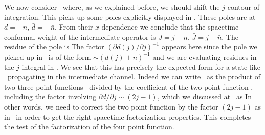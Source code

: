 


We now consider
\intadd\ where, as we  explained before, we should shift the $j$
contour of integration. This picks up some poles explicitly
displayed in \expandF .
These poles are at $d =-n$, $\bar d = -\bar n$. From their
$x$ dependence we conclude that the spacetime conformal weight
of the intermediate operator is $J = j-n$, $\bar J = j - \bar n$.
The residue of the pole is
\eqn{}
The factor $(\partial d(j) / \partial j)^{-1}$
 appears here since the pole we picked up
in \expandF\ is of the form $\sim (d(j)+ n)^{-1}$
and we are evaluating residues in the $j$ integral in \intadd .
We see that this
has precisely the expected form for a state like
\statef\ propagating in the intermediate channel.
Indeed we can write \polesinj\ as the product of two three point
functions \threepxus\ divided by the coefficient of the
two point function \twoneg , including
the factor involving $\partial d / \partial j \sim  (2 j-1) $,
which we discussed at \twoptcorr\ as
\eqn{}
In other words, we need to
correct the two point function by the factor $(2j-1)$
as in \twoptcorr\ in order
to get the right spacetime factorization properties. This completes
the test of the factorization of the four point function.



